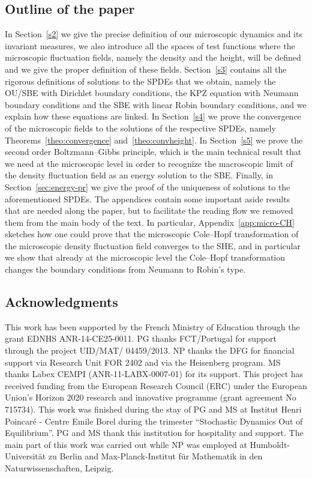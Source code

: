 \documentclass[10pt]{amsart}
\theoremstyle{definition}\newtheorem{defi}[theo]{Definition}\newtheorem{rema}[theo]{Remark}\newtheorem{exam}[theo]{Example}\newtheorem{exem}[theo]{Example}\newtheorem{nota}[theo]{Notation}
\begin{document}
\subsection{Outline of the paper}
In Section~\ref{s2} we give the precise definition of our microscopic dynamics and its invariant measures, we also introduce all the spaces of test functions where the microscopic fluctuation fields, namely the density and the height, will be defined and we give the proper definition of these fields. Section~\ref{s3} contains all the rigorous definitions of solutions to the SPDEs that we obtain, namely the OU/SBE with Dirichlet boundary conditions, the KPZ equation with Neumann boundary conditions and the SBE with linear Robin boundary conditions, and we explain how these equations are linked. In Section~\ref{s4} we prove the convergence of the microscopic fields to the solutions of the respective SPDEs, namely Theorems~\ref{theo:convergence} and~\ref{theo:convheight}. In Section~\ref{s5} we prove the second order Boltzmann--Gibbs principle, which is the main technical result that we need at the microscopic level in order to recognize the macroscopic limit of the density fluctuation field as an energy solution to the SBE. Finally, in Section~\ref{sec:energy-pr} we give the proof of the uniqueness of solutions to the aforementioned SPDEs. The appendices contain some important aside results that are needed along the paper, but to facilitate the reading flow we removed them from the main body of the text. In particular, Appendix~\ref{app:micro-CH} sketches how one could prove that the microscopic Cole--Hopf transformation of the microscopic density fluctuation field converges to the SHE, and in particular we show that already at the microscopic level the Cole--Hopf transformation changes the boundary conditions from Neumann to Robin's type.

\subsection*{Acknowledgments}
This work has been supported by the French Ministry of Education through the grant EDNHS ANR-14-CE25-0011. PG thanks FCT/Portugal for support through the project UID/MAT/ 04459/2013.
NP thanks the DFG for financial support via Research Unit FOR 2402 and via the Heisenberg program.
MS thanks Labex CEMPI (ANR-11-LABX-0007-01) for its support. This project has received funding from the European Research Council (ERC) under the European Union's Horizon 2020 research and innovative programme (grant agreement No 715734). This work was finished during the stay of PG and MS at Institut Henri Poincar\'e - Centre Emile Borel during the trimester ``Stochastic Dynamics Out of Equilibrium''. PG and MS thank this institution for hospitality and support.
The main part of this work was carried out while NP was employed at Humboldt-Universität zu Berlin and Max-Planck-Institut für Mathematik in den Naturwissenschaften, Leipzig.
\end{document}
